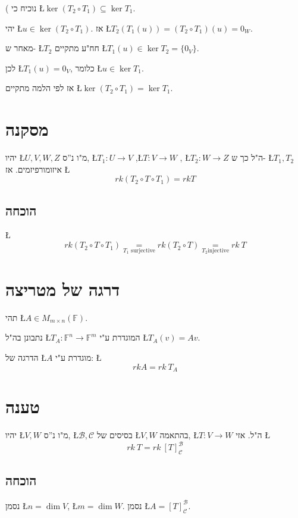 \documentclass[english,hebrew]{article}
\begin{document}
{\endL}( נוכיח כי \L{$\ker(T_{2}\circ T_{1})\subseteq\ker T_{1}$}.

יהי \L{$u\in\ker(T_{2}\circ T_{1})$}. אז \L{$T_{2}(T_{1}(u))=(T_{2}\circ T_{1})(u)=0_{W}$}.

מאחר ש- \L{$T_{2}$} חח"ע מתקיים \L{$T_{1}(u)\in\ker T_{2}=\{0_{V}\}$}.

לכן \L{$T_{1}(u)=0_{V}$}, כלומר \L{$u\in\ker T_{1}$}.

אז לפי הלמה מתקיים \L{$\ker(T_{2}\circ T_{1})=\ker T_{1}$}.

\section{מסקנה}

יהיו \L{$U,V,W,Z$} מ"ו נ\textquotedblright ס, \L{$T_{1}:U\to V$}
,\L{$T:V\to W$} , \L{$T_{2}:W\to Z$} ה"ל כך ש- \L{$T_{1},T_{2}$}
איזומורפיזמים. אז \L{%
\[
rk(T_{2}\circ T\circ T_{1})=rkT
\]
}%

\subsection{הוכחה}

\L{%
\[
rk(T_{2}\circ T\circ T_{1})\underset{T_{1}\text{ surjective}}{=}rk(T_{2}\circ T)\underset{T_{2}\text{injective}}{=}rk\ T
\]
}%

\section{דרגה של מטריצה}

תהי \L{$A\in M_{m\times n}(\mathbb{F})$}. 

נתבונן בה"ל \L{$T_{A}:\mathbb{F}^{n}\to\mathbb{F}^{m}$} המוגדרת
ע"י \L{$T_{A}(v)=Av$}.

הדרגה של \L{$A$} מוגדרת ע"י: \L{%
\[
rkA=rk\ T_{A}
\]
}%

\section{טענה}

יהיו \L{$V,W$} מ"ו נ\textquotedblright ס, \L{$\mathcal{B},\mathcal{C}$}
בסיסים של \L{$V,W$} בהתאמה, \L{$T:V\to W$} ה"ל. אזי \L{%
\[
rk\ T=rk\ [T]_{\mathcal{C}}^{\mathcal{B}}
\]
}%

\subsection{הוכחה}

נסמן \L{$n=\dim V$}, \L{$m=\dim W$}. נסמן \L{$A=[T]_{\mathcal{C}}^{\mathcal{B}}$}.
\end{document}
